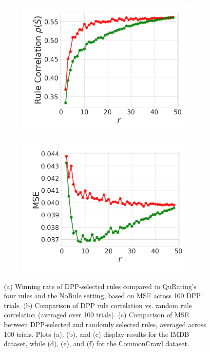 \documentclass{article}
\begin{document}
\begin{figure}[H]
\begin{subfigure}{0.297\textwidth}
  \includegraphics[width=1.0\linewidth]{figures/EvalA_CommonCrawl_Single_dpp_vs_random_RC.pdf}
  \caption{}
  \label{fig:EvalA_CommonCrawl_Single_dpp_vs_random_RC}
\end{subfigure}
\begin{subfigure}{0.3\textwidth}
  \centering
  \includegraphics[width=1.0\linewidth]{figures/EvalA_CommonCrawl_Single_dpp_vs_random_MSE.pdf}
  \caption{}
  \label{fig:EvalA_CommonCrawl_Single_dpp_vs_random_MSE}
\end{subfigure}
\caption{(a) Winning rate of DPP-selected rules compared to QuRating’s four rules and the NoRule setting, based on MSE across 100 DPP trials. (b) Comparison of DPP rule correlation vs. random rule correlation (averaged over 100 trials). (c) Comparison of MSE between DPP-selected and randomly selected rules, averaged across 100 trials. Plots (a), (b), and (c) display results for the IMDB dataset, while (d), (e), and (f) for the CommonCrawl dataset.}
\end{figure}
\end{document}

